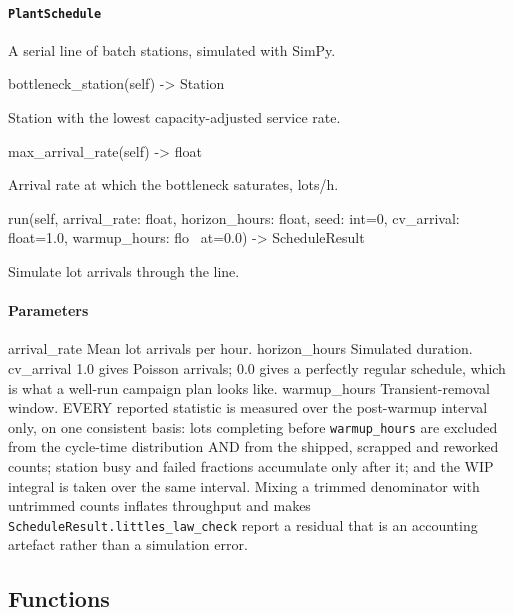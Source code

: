 \documentclass[10pt,a4paper,twoside]{report}
\begin{document}
\paragraph{\texttt{PlantSchedule}}

A serial line of batch stations, simulated with SimPy.

\begin{verbatimsmall}
bottleneck_station(self) -> Station
\end{verbatimsmall}

Station with the lowest capacity-adjusted service rate.

\begin{verbatimsmall}
max_arrival_rate(self) -> float
\end{verbatimsmall}

Arrival rate at which the bottleneck saturates, lots/h.

\begin{verbatimsmall}
run(self, arrival_rate: float, horizon_hours: float, seed: int=0, cv_arrival: float=1.0, warmup_hours: flo
    \ at=0.0) -> ScheduleResult
\end{verbatimsmall}

Simulate lot arrivals through the line.

\paragraph*{Parameters}

arrival\_rate Mean lot arrivals per hour. horizon\_hours Simulated duration. cv\_arrival 1.0 gives Poisson arrivals; 0.0 gives a perfectly regular schedule, which is what a well-run campaign plan looks like. warmup\_hours Transient-removal window. EVERY reported statistic is measured over the post-warmup interval only, on one consistent basis: lots completing before \texttt{warmup\_hours} are excluded from the cycle-time distribution AND from the shipped, scrapped and reworked counts; station busy and failed fractions accumulate only after it; and the WIP integral is taken over the same interval. Mixing a trimmed denominator with untrimmed counts inflates throughput and makes \texttt{ScheduleResult.littles\_law\_check} report a residual that is an accounting artefact rather than a simulation error.

\subsection*{Functions}
\end{document}
